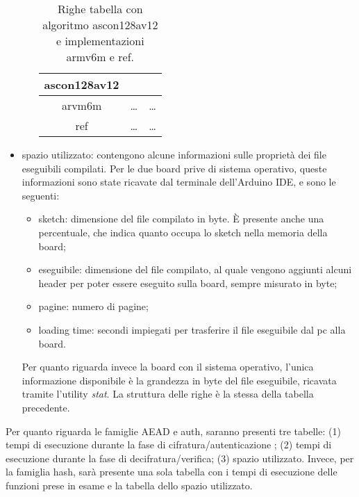\begin{itemize}
\begin{itemize}
\begin{itemize}
            \end{itemize}
            \begin{table}[H]
                \centering
            	\begin{tabular}{|c|c|c|}
            		\hline
                    ascon128av12 & & \\
                    \hline
                    arvm6m & \dots & \dots \\
                    \hline
                    ref & \dots & \dots \\
            		\hline
                \end{tabular}
                \caption{Righe tabella con algoritmo ascon128av12 e implementazioni armv6m e ref.}
            \end{table}
    \end{itemize}
    \item spazio utilizzato: contengono alcune informazioni sulle proprietà dei file eseguibili compilati. Per le due board prive di sistema operativo, queste informazioni sono state ricavate dal terminale dell'Arduino IDE, e sono le seguenti:
    \begin{itemize}
        \item sketch: dimensione del file compilato in byte. È presente anche una percentuale, che indica quanto occupa lo sketch nella memoria della board;
        \item eseguibile: dimensione del file compilato, al quale vengono aggiunti alcuni header per poter essere eseguito sulla board, sempre misurato in byte;
        \item pagine: numero di pagine;
        \item loading time: secondi impiegati per trasferire il file eseguibile dal pc alla board.
    \end{itemize}
    Per quanto riguarda invece la board con il sistema operativo, l'unica informazione disponibile è la grandezza in byte del file eseguibile, ricavata tramite l'utility \textit{stat}. La struttura delle righe è la stessa della tabella precedente.
\end{itemize}

\noindent Per quanto riguarda le famiglie AEAD e auth, saranno presenti tre tabelle: (1) tempi di esecuzione durante la fase di cifratura/autenticazione ; (2) tempi di esecuzione durante la fase di decifratura/verifica; (3) spazio utilizzato. Invece, per la famiglia hash, sarà presente una sola tabella con i tempi di esecuzione delle funzioni prese in esame e la tabella dello spazio utilizzato.

